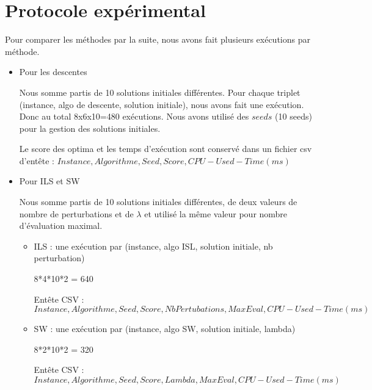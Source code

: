 \section{Protocole expérimental}

Pour comparer les méthodes par la suite, nous avons fait plusieurs exécutions
par méthode. 

\begin{itemize}
	\item Pour les descentes
	
	Nous somme partis de 10 solutions initiales différentes. Pour chaque triplet (instance, algo de descente, solution initiale), nous avons fait une exécution. Donc au total 8x6x10=480 exécutions.  Nous avons utilisé des $seeds$ (10 seeds) pour la gestion des solutions initiales. 
	
	Le score des optima et les temps d'exécution sont conservé dans un fichier csv d'entête : 
	$Instance,Algorithme,Seed,Score,CPU-Used-Time (ms)$
	
	\item Pour ILS et SW
	
	Nous somme partis de 10 solutions initiales différentes, de deux valeurs de nombre de perturbations et de $\lambda$ et utilisé la même valeur pour nombre d’évaluation maximal.
	
	\begin{itemize}
		\item ILS : une exécution par (instance, algo ISL, solution initiale, nb perturbation)
		
		8*4*10*2 = 640
		
		Entête CSV : $Instance,Algorithme,Seed,Score,NbPertubations,MaxEval,CPU-Used-Time (ms)$
		
		\item SW : une exécution par (instance, algo SW, solution initiale, lambda)
		
		8*2*10*2 = 320
		
		
		Entête CSV : $Instance,Algorithme,Seed,Score,Lambda,MaxEval,CPU-Used-Time (ms)$
	\end{itemize}
	
	
\end{itemize}
